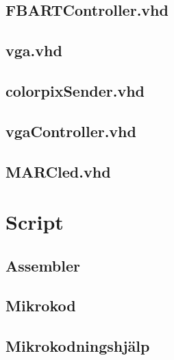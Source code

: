 \documentclass[11pt]{article}
\begin{document}
\newpage
\subsection{FBARTController.vhd}


\newpage
\subsection{vga.vhd}


\newpage
\subsection{colorpixSender.vhd}


\newpage
\subsection{vgaController.vhd}


\newpage
\subsection{MARCled.vhd}



\newpage
\section{Script}

\subsection{Assembler}


\newpage
\subsection{Mikrokod}


\newpage
\subsection{Mikrokodningshjälp}

\end{document}
